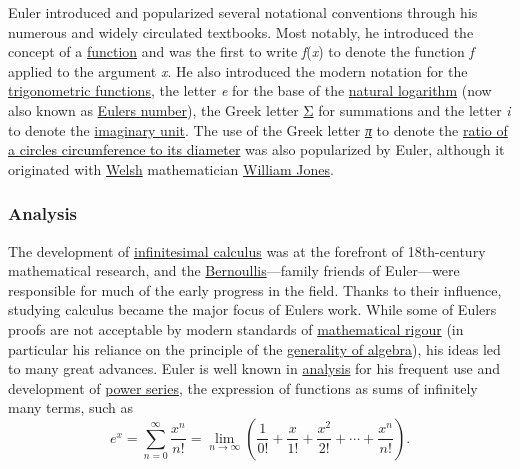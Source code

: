 Euler introduced and popularized several notational conventions through his numerous and widely circulated textbooks. Most notably, he introduced the concept of a \href{https://en.wikipedia.org/wiki/Function_(mathematics)}{function} and was the first to write {\emph{f}(\emph{x})} to denote the function {\emph{f}} applied to the argument {\emph{x}}. He also introduced the modern notation for the \href{https://en.wikipedia.org/wiki/Trigonometric_functions}{trigonometric functions}, the letter {\emph{e}} for the base of the \href{https://en.wikipedia.org/wiki/Natural_logarithm}{natural logarithm} (now also known as \href{https://en.wikipedia.org/wiki/Euler's_number}{Euler\textquotesingle s number}), the Greek letter \href{https://en.wikipedia.org/wiki/Sigma}{Σ} for summations and the letter {\emph{i}} to denote the \href{https://en.wikipedia.org/wiki/Imaginary_unit}{imaginary unit}. The use of the Greek letter \emph{\href{https://en.wikipedia.org/wiki/Pi_(letter)}{π}} to denote the \href{https://en.wikipedia.org/wiki/Pi}{ratio of a circle\textquotesingle s circumference to its diameter} was also popularized by Euler, although it originated with \href{https://en.wikipedia.org/wiki/Welsh_people}{Welsh} mathematician \href{https://en.wikipedia.org/wiki/William_Jones_(mathematician)}{William Jones}.


\subsubsection{Analysis}\label{Analysis}

The development of \href{https://en.wikipedia.org/wiki/Infinitesimal_calculus}{infinitesimal calculus} was at the forefront of 18th-century mathematical research, and the \href{https://en.wikipedia.org/wiki/Bernoulli_family}{Bernoullis}---family friends of Euler---were responsible for much of the early progress in the field. Thanks to their influence, studying calculus became the major focus of Euler\textquotesingle s work. While some of Euler\textquotesingle s proofs are not acceptable by modern standards of \href{https://en.wikipedia.org/wiki/Mathematical_rigor}{mathematical rigour} (in particular his reliance on the principle of the \href{https://en.wikipedia.org/wiki/Generality_of_algebra}{generality of algebra}), his ideas led to many great advances.
Euler is well known in \href{https://en.wikipedia.org/wiki/Mathematical_analysis}{analysis} for his frequent use and development of \href{https://en.wikipedia.org/wiki/Power_series}{power series}, the expression of functions as sums of infinitely many terms, such as
{{\[e^{x} = \sum\limits_{n = 0}^{\infty}\frac{x^{n}}{n!} = \lim\limits_{n\rightarrow\infty}\left( {\frac{1}{0!} + \frac{x}{1!} + \frac{x^{2}}{2!} + \cdots + \frac{x^{n}}{n!}} \right).\]}{}}

